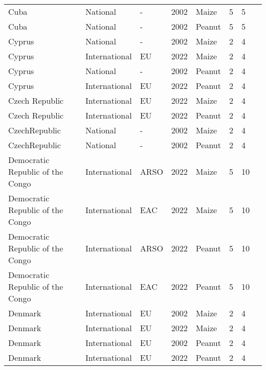 \begin{landscape}
\begin{longtable}[c]{llllllll}
Cuba              & National      & -        & 2002 & Maize  & 5  & 5  & \citet{van2004worldwide}     \\
Cuba              & National      & -        & 2002 & Peanut & 5  & 5  & \citet{van2004worldwide}     \\
Cyprus            & National      & -        & 2002 & Maize  & 2  & 4  & \citet{van2004worldwide}     \\
Cyprus            & International & EU       & 2022 & Maize  & 2  & 4  & \citet{EC2010}               \\
Cyprus            & National      & -        & 2002 & Peanut & 2  & 4  & \citet{van2004worldwide}     \\
Cyprus            & International & EU       & 2022 & Peanut & 2  & 4  & \citet{EC2010}               \\
Czech Republic    & International & EU       & 2022 & Maize  & 2  & 4  & \citet{EC2010}               \\
Czech Republic    & International & EU       & 2022 & Peanut & 2  & 4  & \citet{EC2010}               \\
CzechRepublic     & National      & -        & 2002 & Maize  & 2  & 4  & \citet{van2004worldwide}     \\
CzechRepublic     & National      & -        & 2002 & Peanut & 2  & 4  & \citet{van2004worldwide}     \\
Democratic Republic of the Congo &
  International &
  ARSO &
  2022 &
  Maize &
  5 &
  10 &
  \citet{ARSO2022} \\
Democratic Republic of the Congo &
  International &
  EAC &
  2022 &
  Maize &
  5 &
  10 &
  \citet{EAC2018} \\
Democratic Republic of the Congo &
  International &
  ARSO &
  2022 &
  Peanut &
  5 &
  10 &
  \citet{ARSO2022} \\
Democratic Republic of the Congo &
  International &
  EAC &
  2022 &
  Peanut &
  5 &
  10 &
  \citet{EAC2018} \\
Denmark           & International & EU       & 2002 & Maize  & 2  & 4  & \citet{EC2010}               \\
Denmark           & International & EU       & 2022 & Maize  & 2  & 4  & \citet{EC2010}               \\
Denmark           & International & EU       & 2002 & Peanut & 2  & 4  & \citet{EC2010}               \\
Denmark           & International & EU       & 2022 & Peanut & 2  & 4  & \citet{EC2010}               \\

\end{longtable}
\end{landscape}
